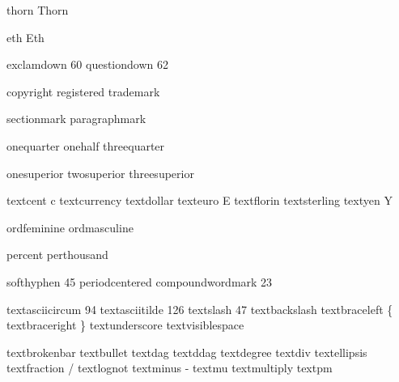  thorn            {\unknownchar}
 Thorn            {\unknownchar}

 eth              {\unknownchar} %
 Eth              {\Dstroke}     %

 exclamdown        60
 questiondown      62

 copyright        {}
 registered       {}
 trademark        {}

 sectionmark      {}
 paragraphmark    {}

 onequarter       {}
 onehalf          {}
 threequarter     {}

 onesuperior      {}
 twosuperior      {}
 threesuperior    {}

 textcent         {c}
 textcurrency     {\unknownchar}
 textdollar       {\fakedollar}
 texteuro         {E}
 textflorin       {\fakeflorin}
 textsterling     {\fakesterling}
 textyen          {Y}

 ordfeminine      {}
 ordmasculine     {}

 percent          {\fakepercent}
 perthousand      {\fakeperthousand}

 softhyphen        45
 periodcentered   {\mathematics\cdot}
 compoundwordmark  23

 textasciicircum   94
 textasciitilde   126
 textslash         47
 textbackslash    {\tex{}} %
 textbraceleft    {\mathematics\{}
 textbraceright   {\mathematics\}}
 textunderscore   {\fakeunderscore}
 textvisiblespace {\fakevisiblespace}

 textbrokenbar    {\mathematics\vert}
 textbullet       {\mathematics\bullet}
 textdag          {\mathematics\dag}
 textddag         {\mathematics\ddag}
 textdegree       {\mathematics{{}^{\circ}}}
 textdiv          {\mathematics\div}
 textellipsis     {\mathematics\cdots}
 textfraction     {\mathematics/}
 textlognot       {\mathematics\neg}
 textminus        {\mathematics-}
 textmu           {\mathematics\mu}
 textmultiply     {\mathematics\times}
 textpm           {\mathematics\pm}

